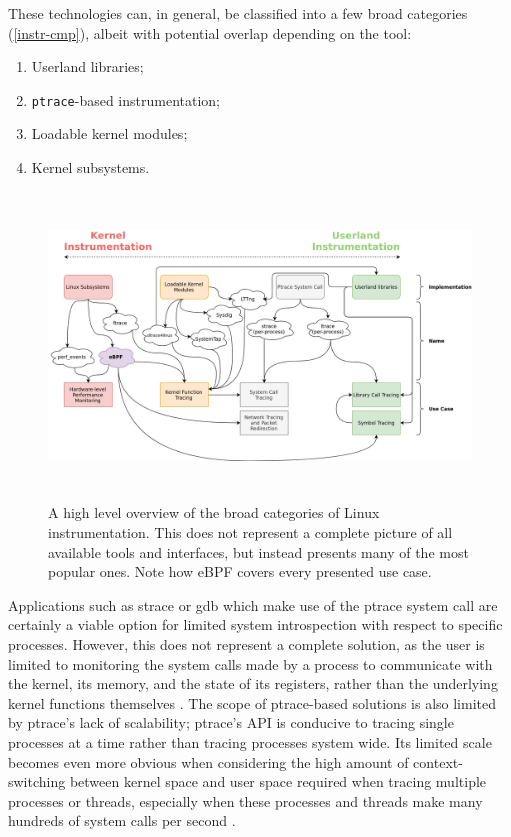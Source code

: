 \documentclass[
  12pt]{findlay}
\newcommand{\passthrough}[1]{#1}
\providecommand{\tightlist}{\setlength{\itemsep}{0pt}\setlength{\parskip}{0pt}}
\begin{document}
These technologies can, in general, be classified into a few broad
categories (\autoref{instr-cmp}), albeit with potential overlap
depending on the tool:

\begin{enumerate}
\def\labelenumi{\arabic{enumi})}
\tightlist
\item
  Userland libraries;
\item
  \passthrough{\lstinline!ptrace!}-based instrumentation;
\item
  Loadable kernel modules;
\item
  Kernel subsystems.
\end{enumerate}

\begin{figure}[p]
\begin{center}
\includegraphics[keepaspectratio, height=3.2in]{../figures/instr-cmp.png}
\end{center}
\caption[A high level overview of the broad categories of Linux instrumentation]{
A high level overview of the broad categories of Linux instrumentation.
This does not represent a complete picture of all available tools and interfaces,
but instead presents many of the most popular ones. Note how eBPF covers every presented use case.
}
\label{instr-cmp}
\end{figure}

\FloatBarrier

Applications such as strace \autocite{strace,manstrace} or gdb
\autocite{gdb20} which make use of the ptrace system call are certainly
a viable option for limited system introspection with respect to
specific processes. However, this does not represent a complete
solution, as the user is limited to monitoring the system calls made by
a process to communicate with the kernel, its memory, and the state of
its registers, rather than the underlying kernel functions themselves
\autocite{manptrace}. The scope of ptrace-based solutions is also
limited by ptrace's lack of scalability; ptrace's API is conducive to
tracing single processes at a time rather than tracing processes system
wide. Its limited scale becomes even more obvious when considering the
high amount of context-switching between kernel space and user space
required when tracing multiple processes or threads, especially when
these processes and threads make many hundreds of system calls per
second \autocite{keniston07}.
\end{document}
